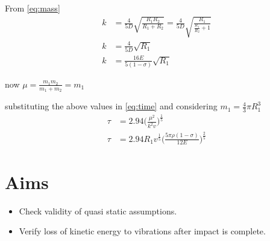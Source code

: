 From \ref{eq:mass} 
\begin{align*}
k &= \frac{4}{5D} \sqrt{\frac{R_{1} R_{2}}{R_{1} + R_{2}}}= \frac{4}{5D} \sqrt{\frac{R_{1}}{\frac{R_{1}}{R_{2}} + 1}}\\
k &= \frac{4}{5D} \sqrt{R_{1}} \\
k &= \frac{16E}{5(1-\sigma)} \sqrt{R_{1}}
\end{align*}

now $\mu=\frac{m_{1}m_{2}}{m_{1}+m_{2}}=m_{1}$

substituting the above values in \ref{eq:time} and considering $m_{1}=\frac{4}{3}\pi R_{1}^{3}$
\begin{align*}
\tau &= 2.94 \Big( \frac{\mu^{2}}{k^{2}v} \Big)^{\frac{1}{5}} \\
\tau &= 2.94R_{1}v^{\frac{1}{5}} \Big( \frac{5\pi \rho (1-\sigma)}{12E} \Big)^{\frac{2}{5}}
\end{align*}



\section{Aims}

\begin{itemize}
\item Check validity of quasi static assumptions.
\item Verify loss of kinetic energy to vibrations after impact is complete.
\end{itemize}
